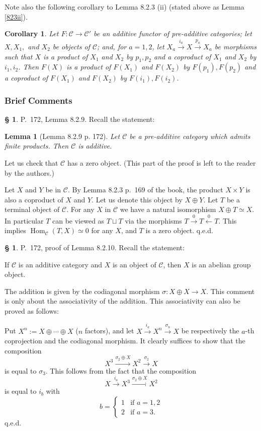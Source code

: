 \documentclass[12pt]{article}
\newtheorem{lem}[thm]{Lemma}
\newtheorem{cor}[thm]{Corollary}
\theoremstyle{remark}
\theoremstyle{definition}
\newtheorem{s}[thm]{\S}
\newcommand{\C}{\mathcal C}
\newcommand{\xl}{\xleftarrow}
\newcommand{\xr}{\xrightarrow}
\DeclareMathOperator{\Hom}{Hom}
\begin{document}
Note also the following corollary to Lemma 8.2.3 (ii) (stated above as Lemma \ref{823ii}). 

\begin{cor}\label{823b}
Let $F:\C\to\C'$ be an additive functor of pre-additive categories; let $X,X_1,$ and $X_2$ be objects of $\C$; and, for $a=1,2$, let $X_a\xr{i_a}X\xr{p_a}X_a$ be morphisms such that $X$ is a product of $X_1$ and $X_2$ by $p_1,p_2$ and a coproduct of $X_1$ and $X_2$ by $i_1,i_2$. Then $F(X)$ is a product of $F(X_1)$ and $F(X_2)$ by $F(p_1),F(p_2)$ and a coproduct of $F(X_1)$ and $F(X_2)$ by $F(i_1),F(i_2)$. 
\end{cor}


\subsubsection{Brief Comments}

\begin{s} 
P.~172, Lemma 8.2.9. Recall the statement:

\begin{lem}[Lemma 8.2.9 p. 172] 
Let $\C$ be a pre-additive category which admits finite products. Then $\C$ is additive.
\end{lem}

Let us check that $\C$ has a zero object. (This part of the proof is left to the reader by the authors.) 

Let $X$ and $Y$ be in $\C$. By Lemma 8.2.3 p.~169 of the book, the product $X\times Y$ is also a coproduct of $X$ and $Y$. Let us denote this object by $X\oplus Y$. Let $T$ be a terminal object of $\C$. For any $X$ in $\C$ we have a natural isomorphism $X\oplus T\simeq X$. In particular $T$ can be viewed as $T\sqcup T$ via the morphisms $T\xr0T\xl0T$. This implies $\Hom_\C(T,X)\simeq0$ for any $X$, and $T$ is a zero object. q.e.d.
\end{s}

%

\begin{s} 
P.~172, proof of Lemma 8.2.10. Recall the statement: 

If $\C$ is an additive category and $X$ is an object of $\C$, then $X$ is an abelian group object. 

The addition is given by the codiagonal morphism $\sigma:X\oplus X\to X$. This comment is only about the associativity of the addition. This associativity can also be proved as follows:

Put $X^n:=X\oplus\cdots\oplus X$ ($n$ factors), and let $X\xr{i_a}X^n\xr{\sigma_n}X$ be respectively the $a$-th coprojection and the codiagonal morphism. It clearly suffices to show that the composition 
$$
X^3\xr{\sigma_2\oplus X}X^2\xr{\sigma_2}X
$$ 
is equal to $\sigma_3$. This follows from the fact that the composition 
$$
X\xr{i_a}X^3\xr{\sigma_2\oplus X}X^2
$$ 
is equal to $i_b$ with 
$$
b=\begin{cases}1&\text{if }a=1,2\\2&\text{if }a=3.\end{cases}
$$ 
q.e.d.
\end{s}
\end{document}
